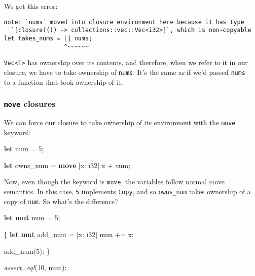 \documentclass[a4paper,]{book}
\newenvironment{Shaded}{\begin{snugshade}}{\end{snugshade}}
\newcommand{\KeywordTok}[1]{\textcolor[rgb]{0.13,0.29,0.53}{\textbf{{#1}}}}
\newcommand{\DataTypeTok}[1]{\textcolor[rgb]{0.13,0.29,0.53}{{#1}}}
\newcommand{\DecValTok}[1]{\textcolor[rgb]{0.00,0.00,0.81}{{#1}}}
\newcommand{\PreprocessorTok}[1]{\textcolor[rgb]{0.56,0.35,0.01}{\textit{{#1}}}}
\newcommand{\NormalTok}[1]{{#1}}
\begin{document}
We get this error:

\begin{verbatim}
note: `nums` moved into closure environment here because it has type
  `[closure(()) -> collections::vec::Vec<i32>]`, which is non-copyable
let takes_nums = || nums;
                 ^~~~~~~
\end{verbatim}

\texttt{Vec\textless{}T\textgreater{}} has ownership over its contents,
and therefore, when we refer to it in our closure, we have to take
ownership of \texttt{nums}. It's the same as if we'd passed
\texttt{nums} to a function that took ownership of it.

\hypertarget{move-closures}{\subsubsection{\texorpdfstring{\texttt{move}
closures}{move closures}}\label{move-closures}}

We can force our closure to take ownership of its environment with the
\texttt{move} keyword:

\begin{Shaded}
\begin{Highlighting}[]
\KeywordTok{let} \NormalTok{num = }\DecValTok{5}\NormalTok{;}

\KeywordTok{let} \NormalTok{owns_num = }\KeywordTok{move} \NormalTok{|x: }\DataTypeTok{i32}\NormalTok{| x + num;}
\end{Highlighting}
\end{Shaded}

Now, even though the keyword is \texttt{move}, the variables follow
normal move semantics. In this case, \texttt{5} implements
\texttt{Copy}, and so \texttt{owns\_num} takes ownership of a copy of
\texttt{num}. So what's the difference?

\begin{Shaded}
\begin{Highlighting}[]
\KeywordTok{let} \KeywordTok{mut} \NormalTok{num = }\DecValTok{5}\NormalTok{;}

\NormalTok{\{}
    \KeywordTok{let} \KeywordTok{mut} \NormalTok{add_num = |x: }\DataTypeTok{i32}\NormalTok{| num += x;}

    \NormalTok{add_num(}\DecValTok{5}\NormalTok{);}
\NormalTok{\}}

\PreprocessorTok{assert_eq!}\NormalTok{(}\DecValTok{10}\NormalTok{, num);}
\end{Highlighting}
\end{Shaded}
\end{document}

